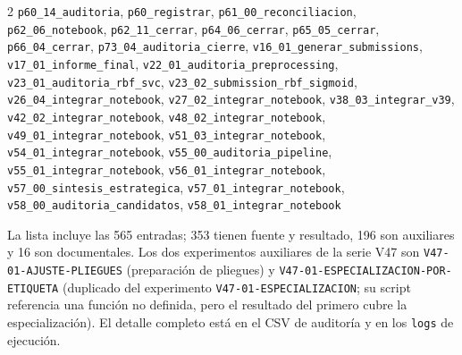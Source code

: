 \begin{multicols}{2}
\texttt{p60\_\allowbreak{}14\_\allowbreak{}auditoria}, \texttt{p60\_\allowbreak{}registrar}, \texttt{p61\_\allowbreak{}00\_\allowbreak{}reconciliacion}, \texttt{p62\_\allowbreak{}06\_\allowbreak{}notebook}, \texttt{p62\_\allowbreak{}11\_\allowbreak{}cerrar}, \texttt{p64\_\allowbreak{}06\_\allowbreak{}cerrar}, \texttt{p65\_\allowbreak{}05\_\allowbreak{}cerrar}, \texttt{p66\_\allowbreak{}04\_\allowbreak{}cerrar}, \texttt{p73\_\allowbreak{}04\_\allowbreak{}auditoria\_\allowbreak{}cierre}, \texttt{v16\_\allowbreak{}01\_\allowbreak{}generar\_\allowbreak{}submissions}, \texttt{v17\_\allowbreak{}01\_\allowbreak{}informe\_\allowbreak{}final}, \texttt{v22\_\allowbreak{}01\_\allowbreak{}auditoria\_\allowbreak{}preprocessing}, \texttt{v23\_\allowbreak{}01\_\allowbreak{}auditoria\_\allowbreak{}rbf\_\allowbreak{}svc}, \texttt{v23\_\allowbreak{}02\_\allowbreak{}submission\_\allowbreak{}rbf\_\allowbreak{}sigmoid}, \texttt{v26\_\allowbreak{}04\_\allowbreak{}integrar\_\allowbreak{}notebook}, \texttt{v27\_\allowbreak{}02\_\allowbreak{}integrar\_\allowbreak{}notebook}, \texttt{v38\_\allowbreak{}03\_\allowbreak{}integrar\_\allowbreak{}v39}, \texttt{v42\_\allowbreak{}02\_\allowbreak{}integrar\_\allowbreak{}notebook}, \texttt{v48\_\allowbreak{}02\_\allowbreak{}integrar\_\allowbreak{}notebook}, \texttt{v49\_\allowbreak{}01\_\allowbreak{}integrar\_\allowbreak{}notebook}, \texttt{v51\_\allowbreak{}03\_\allowbreak{}integrar\_\allowbreak{}notebook}, \texttt{v54\_\allowbreak{}01\_\allowbreak{}integrar\_\allowbreak{}notebook}, \texttt{v55\_\allowbreak{}00\_\allowbreak{}auditoria\_\allowbreak{}pipeline}, \texttt{v55\_\allowbreak{}01\_\allowbreak{}integrar\_\allowbreak{}notebook}, \texttt{v56\_\allowbreak{}01\_\allowbreak{}integrar\_\allowbreak{}notebook}, \texttt{v57\_\allowbreak{}00\_\allowbreak{}sintesis\_\allowbreak{}estrategica}, \texttt{v57\_\allowbreak{}01\_\allowbreak{}integrar\_\allowbreak{}notebook}, \texttt{v58\_\allowbreak{}00\_\allowbreak{}auditoria\_\allowbreak{}candidatos}, \texttt{v58\_\allowbreak{}01\_\allowbreak{}integrar\_\allowbreak{}notebook}\par\smallskip
\end{multicols}

La lista incluye las 565 entradas; 353 tienen fuente y resultado, 196 son
auxiliares y 16 son documentales. Los dos experimentos auxiliares de la serie
V47 son \texttt{V47-\allowbreak{}01-\allowbreak{}AJUSTE-\allowbreak{}PLIEGUES} (preparación de pliegues) y
\texttt{V47-\allowbreak{}01-\allowbreak{}ESPECIALIZACION-\allowbreak{}POR-\allowbreak{}ETIQUETA} (duplicado del experimento
\texttt{V47-\allowbreak{}01-\allowbreak{}ESPECIALIZACION}; su script referencia una función no definida,
pero el resultado del primero cubre la especialización). El detalle completo
está en el CSV de auditoría y en los \texttt{logs} de ejecución.

